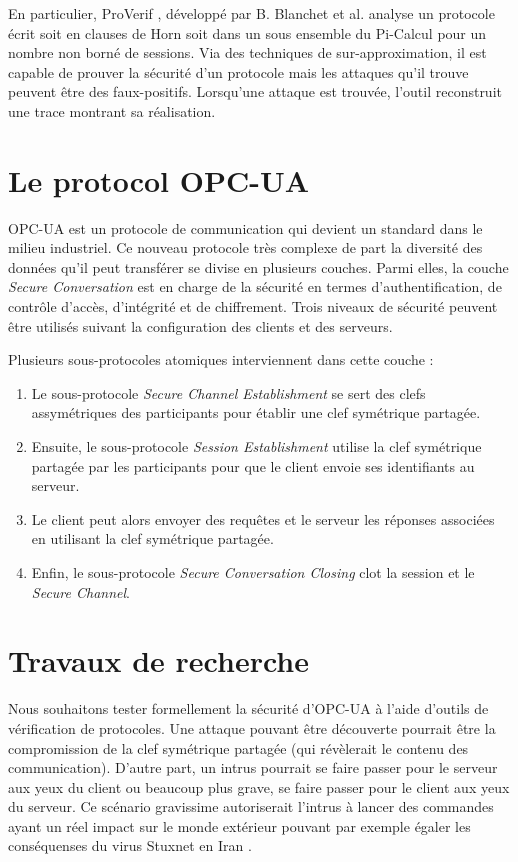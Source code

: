 \documentclass{article}
\newcommand{\proverif}{ProVerif}
\begin{document}
En particulier, \proverif{} \cite{Bla01,PROVERIF14_manual}, développé par B. Blanchet et al. analyse un protocole écrit
soit en clauses de Horn soit dans un sous ensemble du Pi-Calcul pour un nombre non borné
de sessions.
Via des techniques de sur-approximation, il est capable de prouver la sécurité d'un protocole
mais les attaques qu'il trouve peuvent être des faux-positifs.
Lorsqu'une attaque est trouvée, l'outil reconstruit une trace montrant sa réalisation.

\section{Le protocol OPC-UA}

OPC-UA \cite{opc-ua} est un protocole de communication qui devient un standard dans le milieu industriel.
Ce nouveau protocole très complexe de part la diversité des données qu'il peut transférer
se divise en plusieurs couches. 
Parmi elles, la couche {\em Secure Conversation} est en charge de la sécurité en termes d'authentification,
de contrôle d'accès, d'intégrité et de chiffrement.
Trois niveaux de sécurité peuvent être utilisés suivant la configuration des clients et des serveurs.

Plusieurs sous-protocoles atomiques interviennent dans cette couche :
\begin{enumerate}
    \item Le sous-protocole {\em Secure Channel Establishment} se sert des
        clefs assymétriques des participants pour établir une clef symétrique partagée.
    \item Ensuite, le sous-protocole {\em Session Establishment} utilise la clef symétrique partagée
        par les participants pour que le client envoie ses identifiants au serveur.
    \item Le client peut alors envoyer des requêtes et le serveur les réponses associées
        en utilisant la clef symétrique partagée.
    \item Enfin, le sous-protocole {\em Secure Conversation Closing} clot la session et le {\em Secure Channel}.
\end{enumerate}

\section{Travaux de recherche}

Nous souhaitons tester formellement la sécurité d'OPC-UA à l'aide d'outils de vérification de protocoles.
Une attaque pouvant être découverte pourrait être la compromission de la clef symétrique partagée
(qui révèlerait le contenu des communication).
D'autre part, un intrus pourrait se faire passer pour le serveur aux yeux du client ou beaucoup plus grave, se faire passer
pour le client aux yeux du serveur.
Ce scénario gravissime autoriserait l'intrus à lancer des commandes ayant un réel impact sur le monde extérieur
pouvant par exemple égaler les conséquenses du virus Stuxnet en Iran \cite{Lan11}.
\end{document}
